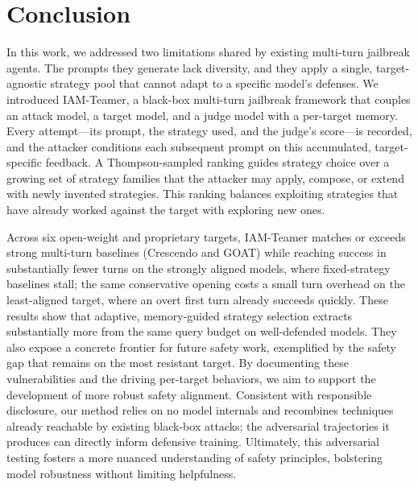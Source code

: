 \section{Conclusion}
\label{sec:conclusion}

In this work, we addressed two limitations shared by existing multi-turn jailbreak agents.
The prompts they generate lack diversity, and they apply a single, target-agnostic strategy pool that cannot adapt to a specific model's defenses.
We introduced IAM-Teamer, a black-box multi-turn jailbreak framework that couples an attack model, a target model, and a judge model with a per-target memory.
Every attempt---its prompt, the strategy used, and the judge's score---is recorded, and the attacker conditions each subsequent prompt on this accumulated, target-specific feedback.
A Thompson-sampled ranking guides strategy choice over a growing set of strategy families that the attacker may apply, compose, or extend with newly invented strategies. This ranking balances exploiting strategies that have already worked against the target with exploring new ones.

Across six open-weight and proprietary targets, IAM-Teamer matches or exceeds strong multi-turn baselines (Crescendo and GOAT) while reaching success in substantially fewer turns on the strongly aligned models, where fixed-strategy baselines stall; the same conservative opening costs a small turn overhead on the least-aligned target, where an overt first turn already succeeds quickly.
These results show that adaptive, memory-guided strategy selection extracts substantially more from the same query budget on well-defended models. They also expose a concrete frontier for future safety work, exemplified by the safety gap that remains on the most resistant target.
By documenting these vulnerabilities and the driving per-target behaviors, we aim to support the development of more robust safety alignment.
Consistent with responsible disclosure, our method relies on no model internals and recombines techniques already reachable by existing black-box attacks; the adversarial trajectories it produces can directly inform defensive training.
Ultimately, this adversarial testing fosters a more nuanced understanding of safety principles, bolstering model robustness without limiting helpfulness.
